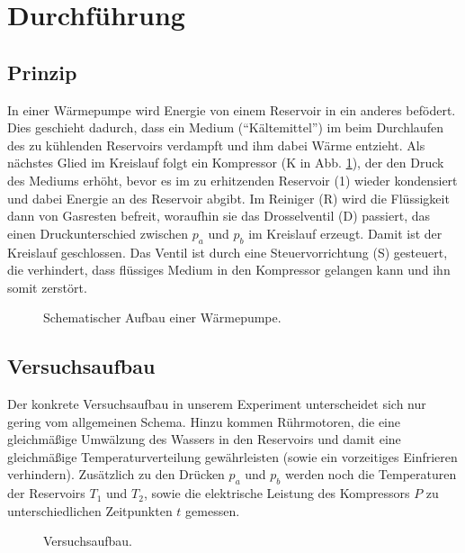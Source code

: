 \section{Durchführung}
\label{sec:Durchführung}
\subsection{Prinzip}
In einer Wärmepumpe wird Energie von einem Reservoir in ein anderes befödert. Dies geschieht dadurch, dass ein Medium (\enquote{Kältemittel}) im beim Durchlaufen des zu kühlenden Reservoirs verdampft und ihm dabei Wärme entzieht. Als nächstes Glied im Kreislauf folgt ein Kompressor (K in Abb. \ref{fig:wärmepumpe}), der den Druck des Mediums erhöht, bevor es im zu erhitzenden Reservoir (1) wieder kondensiert und dabei Energie an des Reservoir abgibt. Im Reiniger (R) wird die Flüssigkeit dann von Gasresten befreit, woraufhin sie das Drosselventil (D) passiert, das einen Druckunterschied zwischen $p_a$ und $p_b$ im Kreislauf erzeugt. Damit ist der Kreislauf geschlossen. Das Ventil ist durch eine Steuervorrichtung (S) gesteuert, die verhindert, dass flüssiges Medium in den Kompressor gelangen kann und ihn somit zerstört.

\begin{figure}
  \centering
  \def\svgwidth{\columnwidth}
  
  \caption{Schematischer Aufbau einer Wärmepumpe.}
  \label{fig:wärmepumpe}
\end{figure}

\subsection{Versuchsaufbau}
Der konkrete Versuchsaufbau in unserem Experiment unterscheidet sich nur gering vom allgemeinen Schema. Hinzu kommen Rührmotoren, die eine gleichmäßige Umwälzung des Wassers in den Reservoirs und damit eine gleichmäßige Temperaturverteilung gewährleisten (sowie ein vorzeitiges Einfrieren verhindern). Zusätzlich zu den Drücken $p_a$ und $p_b$ werden noch die Temperaturen der Reservoirs $T_{1}$ und $T_{2}$, sowie die elektrische Leistung des Kompressors $P$ zu unterschiedlichen Zeitpunkten $t$ gemessen.

\begin{figure}
  \centering
  
  \caption{Versuchsaufbau.}
  \label{fig:aufbau}
\end{figure}
